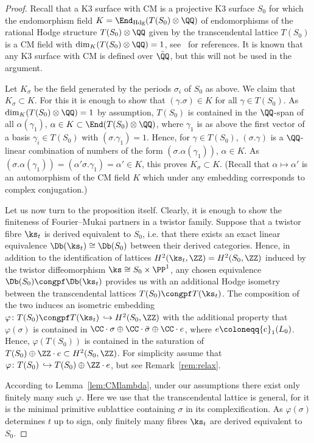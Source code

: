 \begin{proof}
Recall that a K3 surface with CM is a projective K3 surface $S_0$ for which the endomorphism field $K=\End_{\rm Hdg}(T(S_0)\otimes\QQ)$ of endomorphisms of the rational Hodge structure $T(S_0)\otimes\QQ$ given by the transcendental lattice $T(S_0)$ is a CM field with $\dim_K (T(S_0)\otimes\QQ)=1$, see~\cite[Chapter~3]{HuyK3} for references. It is known that any K3 surface with CM is defined over $\bar\QQ$, but this will not be used in the argument.

Let $K_\sigma$ be the field generated by the periods $\sigma_i$ of $S_0$ as above. We claim that $K_\sigma\subset K$. For this it is enough to show that $(\gamma.\sigma)\in K$ for all $\gamma\in T(S_0)$. As $\dim_K(T(S_0)\otimes\QQ)=1$ by assumption, $T(S_0)$ is contained in the $\QQ$-span of all $\alpha(\gamma_1)$, $\alpha\in K\subset\End(T(S_0)\otimes\QQ)$, where $\gamma_1$ is as above the first vector of a basis $\gamma_i\in T(S_0)$ with $(\sigma.\gamma_1)=1$. Hence, for $\gamma\in T(S_0)$, $(\sigma.\gamma)$ is a $\QQ$-linear combination of numbers of the form $(\sigma.\alpha(\gamma_1))$, $\alpha\in K$. As $(\sigma.\alpha(\gamma_1))=(\alpha'\sigma.\gamma_1)=\alpha'\in K$, this proves $K_\sigma\subset K$. (Recall that $\alpha\mapsto\alpha'$ is an automorphism of the CM field $K$ which under any embedding corresponds to complex conjugation.)

Let us now turn to the proposition itself. Clearly, it is enough to show the finiteness of Fourier--Mukai partners in a twistor family. Suppose that a twistor fibre $\ks_t$ is derived equivalent to $S_0$, i.e. that there exists an exact linear equivalence $\Db(\ks_t)\cong\Db(S_0)$ between their derived categories. Hence, in addition to the identification of lattices $H^2(\ks_t,\ZZ)=H^2(S_0,\ZZ)$ induced by the twistor diffeomorphism $\ks\cong S_0\times\PP^1$, any chosen equivalence $\Db(S_0)\congpf\Db(\ks_t)$ provides us with an additional Hodge isometry between the transcendental lattices $T(S_0)\congpf T(\ks_t)$. The composition of the two induces an isometric embedding $\varphi\colon T(S_0)\congpf T(\ks_t)\,\hookrightarrow H^2(S_0,\ZZ)$ with the additional property that $\varphi(\sigma)$ is contained in $\CC\cdot\sigma\oplus\CC\cdot\bar\sigma\oplus\CC\cdot e$, where $e\coloneqq {\rm c}_1(L_0)$. Hence, $\varphi(T(S_0))$ is contained in the saturation of $T(S_0)\oplus\ZZ\cdot e\subset H^2(S_0,\ZZ)$. For simplicity assume that $\varphi\colon T(S_0)\,\hookrightarrow T(S_0)\oplus\ZZ\cdot e$, but see Remark~\ref{rem:relax}.

According to Lemma~\ref{lem:CMlambda}, under our assumptions there exist only finitely many such $\varphi$. Here we use that the transcendental lattice is general, for it is the minimal primitive sublattice containing $\sigma$ in its complexification. As $\varphi(\sigma)$ determines $t$ up to sign, only finitely many fibres $\ks_t$ are derived equivalent to $S_0$.
\end{proof}

